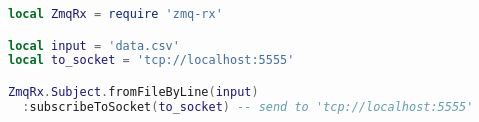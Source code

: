 \begin{lstlisting}[language=LUA,caption={Process pipeline with Zmq-RxLua: data stream.},label=rx-processing-data-stream]
local ZmqRx = require 'zmq-rx'

local input = 'data.csv'
local to_socket = 'tcp://localhost:5555'

ZmqRx.Subject.fromFileByLine(input)
  :subscribeToSocket(to_socket) -- send to 'tcp://localhost:5555'
\end{lstlisting}
